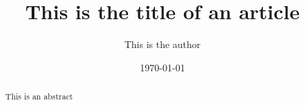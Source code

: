 \documentclass{article}         %
\title{This is the title of an article}
\author{This is the author}
\date{\today}
\begin{document}
\maketitle

\begin{abstract}
This is an abstract
\end{abstract}


\clearpage
\printglossaries{}




\end{document}
